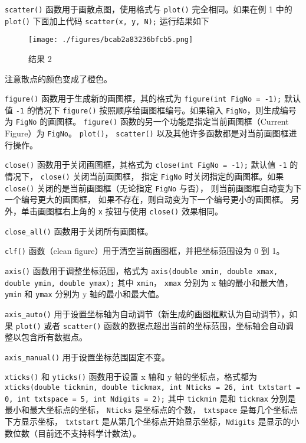 \verb`scatter()` 函数用于画散点图，使用格式与 \verb`plot()` 完全相同。如果在例 1 中的 \verb`plot()` 下面加上代码
\verb`scatter(x, y, N);`
运行结果如下

\begin{figure}[ht]
\centering
\texttt{[image: ./figures/bcab2a83236bfcb5.png]}
\caption{结果 2} \label{fig_MtPlot_4}
\end{figure}

注意散点的颜色变成了橙色。

\verb`figure()` 函数用于生成新的画图框，其的格式为
\verb`figure(int FigNo = -1);`
默认值 \verb`-1` 的情况下 \verb`figure()` 按照顺序给画图框编号。如果输入 \verb`FigNo`，则生成编号为 \verb`FigNo` 的画图框。 \verb`figure()` 函数的另一个功能是指定当前画图框（Current Figure）为 \verb`FigNo`。 \verb`plot()`， \verb`scatter()` 以及其他许多函数都是对当前画图框进行操作。

\verb`close()` 函数用于关闭画图框，其格式为
\verb`close(int FigNo = -1);`
默认值 \verb`-1` 的情况下， \verb`close()` 关闭当前画图框， 指定 \verb`FigNo` 时关闭指定的画图框。如果 \verb`close()` 关闭的是当前画图框（无论指定 \verb`FigNo` 与否）， 则当前画图框自动变为下一个编号更大的画图框， 如果不存在，则自动变为下一个编号更小的画图框。 另外，单击画图框右上角的 \verb`x` 按钮与使用 \verb`close()` 效果相同。

\verb`close_all()` 函数用于关闭所有画图框。

\verb`clf()` 函数（clean figure）用于清空当前画图框，并把坐标范围设为 0 到 1。

\verb`axis()` 函数用于调整坐标范围，格式为
\verb`axis(double xmin, double xmax, double ymin, double ymax);`
其中 \verb`xmin`， \verb`xmax` 分别为 x 轴的最小和最大值， \verb`ymin` 和 \verb`ymax` 分别为 y 轴的最小和最大值。

\verb`axis_auto()` 用于设置坐标轴为自动调节（新生成的画图框默认为自动调节），如果 \verb`plot()` 或者 \verb`scatter()` 函数的数据点超出当前的坐标范围，坐标轴会自动调整以包含所有数据点。

\verb`axis_manual()` 用于设置坐标范围固定不变。

\verb`xticks()` 和 \verb`yticks()` 函数用于设置 x 轴和 y 轴的坐标点，格式都为
\verb`xticks(double tickmin, double tickmax, int Nticks = 26, int txtstart = 0, int txtspace = 5, int Ndigits = 2);`
其中 \verb`tickmin` 是和 \verb`tickmax` 分别是最小和最大坐标点的坐标， \verb`Nticks` 是坐标点的个数， \verb`txtspace` 是每几个坐标点下方显示坐标， \verb`txtstart` 是从第几个坐标点开始显示坐标，\verb`Ndigits` 是显示的小数位数（目前还不支持科学计数法）。

